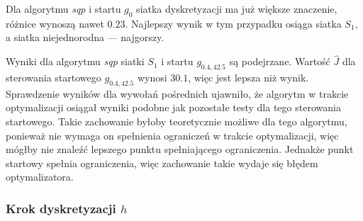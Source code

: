 \documentclass[11pt]{article}
\begin{document}
Dla algorytmu {\it sqp\/} i startu $g_0$ siatka dyskretyzacji ma już większe znaczenie, różnice wynoszą nawet $0.23$. Najlepszy wynik w tym przypadku osiąga siatka $S_1$, a siatka niejednorodna --- najgorszy. 

Wyniki dla algorytmu {\it sqp\/} siatki $S_1$ i startu $g_{0.4,42.5}$ są podejrzane. Wartość $\hat{J}$ dla sterowania startowego $g_{0.4,42.5}$ wynosi $30.1$, więc jest lepsza niż wynik. Sprawdzenie wyników dla wywołań pośrednich ujawniło, że algorytm w trakcie optymalizacji osiągał wyniki podobne jak pozostałe testy dla tego sterowania startowego. Takie zachowanie byłoby teoretycznie możliwe dla tego algorytmu, ponieważ nie wymaga on spełnienia ograniczeń w trakcie optymalizacji, więc mógłby nie znaleźć lepszego punktu spełniającego ograniczenia. Jednakże punkt startowy spełnia ograniczenia, więc zachowanie takie wydaje się błędem optymalizatora.

\subsubsection{Krok dyskretyzacji $h$}
\end{document}
